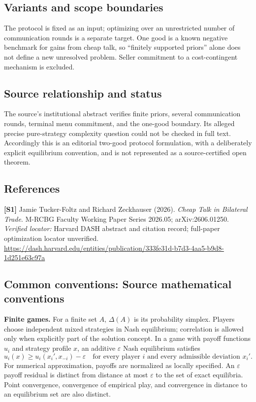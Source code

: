 \documentclass[11pt,a4paper]{article}
\begin{document}
\subsection*{Variants and scope boundaries}
The protocol is fixed as an input; optimizing over an unrestricted number of communication rounds is a separate target. One good is a known negative benchmark for gains from cheap talk, so ``finitely supported priors'' alone does not define a new unresolved problem. Seller commitment to a cost-contingent mechanism is excluded.
\subsection*{Source relationship and status}
The source's institutional abstract verifies finite priors, several communication rounds, terminal menu commitment, and the one-good boundary. Its alleged precise pure-strategy complexity question could not be checked in full text. Accordingly this is an editorial two-good protocol formulation, with a deliberately explicit equilibrium convention, and is not represented as a source-certified open theorem.
\subsection*{References}
\begingroup\footnotesize\raggedright
\textbf{[S1]} Jamie Tucker-Foltz and Richard Zeckhauser (2026). \emph{Cheap Talk in Bilateral Trade}. M-RCBG Faculty Working Paper Series 2026.05; arXiv:2606.01250. \textit{Verified locator:} Harvard DASH abstract and citation record; full-paper optimization locator unverified. \url{https://dash.harvard.edu/entities/publication/333fe31d-b7d3-4aa5-b9d8-1d251e63c97a}
\par\endgroup

\subsection*{Common conventions: Source mathematical conventions}

\textbf{Finite games.} For a finite set $A$, $\Delta(A)$ is its probability
simplex. Players choose independent mixed strategies in Nash equilibrium;
correlation is allowed only when explicitly part of the solution concept.
In a game with payoff functions $u_i$ and strategy profile $x$, an additive
$\varepsilon$ Nash equilibrium satisfies
\[
 u_i(x)\geq u_i(x_i',x_{-i})-\varepsilon
 \quad\text{for every player $i$ and every admissible deviation $x_i'$}.
\]
For numerical approximation, payoffs are normalized as locally specified.
An $\varepsilon$ payoff residual is distinct from distance at most
$\varepsilon$ to the set of exact equilibria. Point convergence, convergence
of empirical play, and convergence in distance to an equilibrium set are
also distinct.
\end{document}
